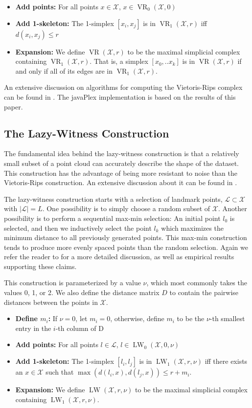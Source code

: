 \documentclass[runningheads,a4paper]{llncs}
\newcommand{\VR}{\operatorname{VR}}
\newcommand{\LW}{\operatorname{LW}}
\begin{document}
\begin{itemize}
\item {\bf Add points:} For all points $x \in \mathcal{X}$, $x \in \VR_0(\mathcal{X}, 0)$
\item {\bf Add 1-skeleton:} The 1-simplex $[x_i, x_j]$ is in $\VR_1(\mathcal{X}, r)$ iff $d(x_i, x_j) \leq r$
\item {\bf Expansion:} We define $\VR(\mathcal{X}, r)$ to be the maximal simplicial complex containing $\VR_1(\mathcal{X}, r)$. That is, a simplex $[x_0, .. x_k]$ is in $\VR(\mathcal{X}, r)$ if and only if all of its edges are in $\VR_1(\mathcal{X}, r)$.
\end{itemize}

An extensive discussion on algorithms for computing the Vietoris-Rips complex can be found in \cite{Zomorodian}. The javaPlex implementation is based on the results of this paper.

\subsection{The Lazy-Witness Construction}
The fundamental idea behind the lazy-witness construction is that a relatively small subset of a point cloud can accurately describe the shape of the dataset. This construction has the advantage of being more resistant to noise than the Vietoris-Rips construction. An extensive discussion about it can be found in \cite{Witness}. 

The lazy-witness construction starts with a selection of landmark points, $\mathcal{L} \subset \mathcal{X}$ with $|\mathcal{L}| = L$. One possibility is to simply choose a random subset of $\mathcal{X}$. Another possibility is to perform a sequential max-min selection: An initial point $l_0$ is selected, and then we inductively select the point $l_k$ which maximizes the minimum distance to all previously generated points. This max-min construction tends to produce more evenly spaced points than the random selection. Again we refer the reader to \cite{Witness} for a more detailed discussion, as well as empirical results supporting these claims.

This construction is parameterized by a value $\nu$, which most commonly takes the values 0, 1, or 2. We also define the distance matrix $D$ to contain the pairwise distances between the points in $\mathcal{X}$. 

\begin{itemize}
\item {\bf Define $m_i$:} If $\nu = 0$, let $m_i = 0$, otherwise, define $m_i$ to be the $\nu$-th smallest entry in the $i$-th column of D
\item {\bf Add points:} For all points $l \in \mathcal{L}$, $l \in \LW_0(\mathcal{X}, 0, \nu)$
\item {\bf Add 1-skeleton:} The 1-simplex $[l_i, l_j]$ is in $\LW_1(\mathcal{X}, r, \nu)$ iff there exists an $x \in \mathcal{X}$ such that $\max(d(l_i, x), d(l_j, x)) \leq r + m_i$.
\item {\bf Expansion:} We define $\LW(\mathcal{X}, r, \nu)$ to be the maximal simplicial complex containing $\LW_1(\mathcal{X}, r, \nu)$. 
\end{itemize}
\end{document}
